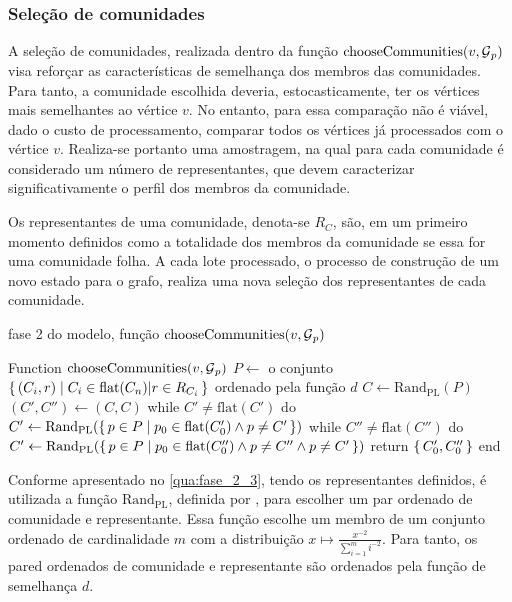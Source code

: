 \documentclass[notes.tex]{subfiles}
\begin{document}
\subsubsection{Seleção de comunidades}

A seleção de comunidades, realizada dentro da função $\text{chooseCommunities}(v, \operatorname{\mathcal{G}}_p)$ visa reforçar as características de semelhança dos membros das comunidades.
Para tanto, a comunidade escolhida deveria, estocasticamente, ter os vértices mais semelhantes ao vértice $v$.
No entanto, para essa comparação não é viável, dado o custo de processamento, comparar todos os vértices já processados com o vértice $v$.
Realiza-se portanto uma amostragem, na qual para cada comunidade é considerado um número de representantes, que devem caracterizar significativamente o perfil dos membros da comunidade.

Os representantes de uma comunidade, denota-se $R_C$, são, em um primeiro momento definidos como a totalidade dos membros da comunidade se essa for uma comunidade folha.
A cada lote processado, o processo de construção de um novo estado para o grafo, realiza uma nova seleção dos representantes de cada comunidade.

\begin{quadro}[htbp]
\caption{fase 2 do modelo, função $\text{chooseCommunities}(v, \operatorname{\mathcal{G}}_p)$}
\label{qua:fase_2_3}
\begin{algorithm}
Function $\text{chooseCommunities}(v, \operatorname{\mathcal{G}}_p)$
    $P \leftarrow $ o conjunto $\set{(C_i, r) | C_i \in \text{flat}(C_n) | r \in R_{C_i}}$ ordenado pela  $\text{função } d$
    $C \leftarrow \text{Rand}_\text{PL}(P)$
    $(C', C'') \leftarrow (C, C)$
    while $C' \neq \text{flat}(C')$ do $C' \leftarrow \text{Rand}_\text{PL}(\set{p \in P | p_0 \in \text{flat}(C'_0) \land p \neq C'})$
    while $C'' \neq \text{flat}(C'')$ do $C' \leftarrow \text{Rand}_\text{PL}(\set{p \in P | p_0 \in \text{flat}(C''_0) \land p \neq C'' \land p \neq C'})$
    return $\set{C'_0, C''_0}$
end
\end{algorithm}
\end{quadro}

Conforme apresentado no \autoref{qua:fase_2_3}, tendo os representantes definidos, é utilizada a função $\text{Rand}_\text{PL}$, definida por , para escolher um par ordenado de comunidade e representante.
Essa função escolhe um membro de um conjunto ordenado de cardinalidade $m$ com a distribuição $x \mapsto \frac{x^{-2}}{\sum^m_{i=1}i^{-2}}$.
Para tanto, os pared ordenados de comunidade e representante são ordenados pela função de semelhança $d$.
\end{document}
